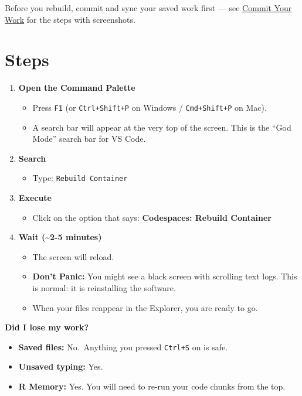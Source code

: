 \documentclass[
  letterpaper,
  DIV=11,
  numbers=noendperiod,
  oneside]{scrreprt}
\providecommand{\tightlist}{%
  \setlength{\itemsep}{0pt}\setlength{\parskip}{0pt}}
\begin{document}
Before you rebuild, commit and sync your saved work first --- see
\hyperref[commit-your-work]{Commit Your Work} for the steps with
screenshots.

\section{Steps}\label{steps-3}

\begin{enumerate}
\def\labelenumi{\arabic{enumi}.}
\tightlist
\item
  \textbf{Open the Command Palette}

  \begin{itemize}
  \tightlist
  \item
    Press \texttt{F1} (or \texttt{Ctrl+Shift+P} on Windows /
    \texttt{Cmd+Shift+P} on Mac).
  \item
    A search bar will appear at the very top of the screen. This is the
    ``God Mode'' search bar for VS Code.
  \end{itemize}
\item
  \textbf{Search}

  \begin{itemize}
  \tightlist
  \item
    Type: \texttt{Rebuild\ Container}
  \end{itemize}
\item
  \textbf{Execute}

  \begin{itemize}
  \tightlist
  \item
    Click on the option that says: \textbf{Codespaces: Rebuild
    Container}
  \end{itemize}
\item
  \textbf{Wait (\textasciitilde2-5 minutes)}

  \begin{itemize}
  \tightlist
  \item
    The screen will reload.
  \item
    \textbf{Don't Panic:} You might see a black screen with scrolling
    text logs. This is normal: it is reinstalling the software.
  \item
    When your files reappear in the Explorer, you are ready to go.
  \end{itemize}
\end{enumerate}

\textbf{Did I lose my work?}

\begin{itemize}
\item
  \textbf{Saved files:} No.~Anything you pressed \texttt{Ctrl+S} on is
  safe.
\item
  \textbf{Unsaved typing:} Yes.
\item
  \textbf{R Memory:} Yes. You will need to re-run your code chunks from
  the top.
\end{itemize}
\end{document}
